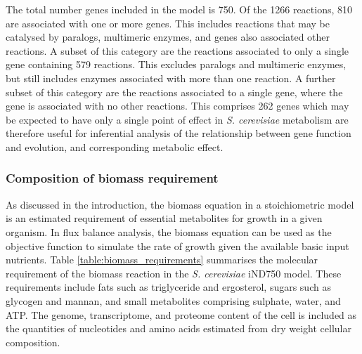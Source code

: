 The total number genes included in the model is 750. Of the 1266 reactions, 810 are associated with one or more genes. This includes reactions that may be catalysed by paralogs, multimeric enzymes, and genes also associated other reactions. A subset of this category are the reactions associated to only a single gene containing 579 reactions. This excludes paralogs and multimeric enzymes, but still includes enzymes associated with more than one reaction. A further subset of this category are the reactions associated to a single gene, where the gene is associated with no other reactions. This comprises 262 genes which may be expected to have only a single point of effect in \emph{S. cerevisiae} metabolism are therefore useful for inferential analysis of the relationship between gene function and evolution, and corresponding metabolic effect.

\subsubsection{Composition of biomass requirement}%

As discussed in the introduction, the biomass equation in a stoichiometric model is an estimated requirement of essential metabolites for growth in a given organism. In flux balance analysis, the biomass equation can be used as the objective function to simulate the rate of growth given the available basic input nutrients. Table \vref{table:biomass_requirements} summarises the molecular requirement of the biomass reaction in the \emph{S. cerevisiae} iND750 model. These requirements include fats such as triglyceride and ergosterol, sugars such as glycogen and mannan, and small metabolites comprising sulphate, water, and ATP. The genome, transcriptome, and proteome content of the cell is included as the quantities of nucleotides and amino acids estimated from dry weight cellular composition.


